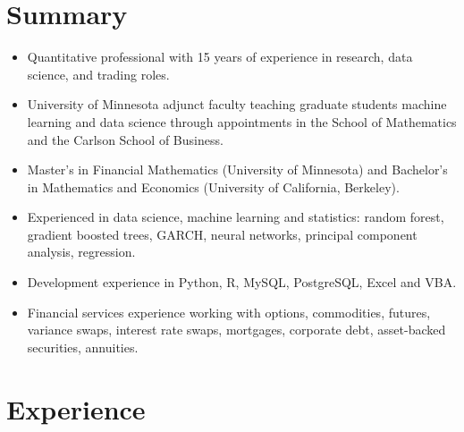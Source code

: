 \documentclass[11pt,a4paper,]{awesome-cv}
\begin{document}
\makecvheader






\hypertarget{summary}{%
\section{Summary}\label{summary}}

\begin{itemize}
\item
  Quantitative professional with 15 years of experience in research,
  data science, and trading roles.
\item
  University of Minnesota adjunct faculty teaching graduate students
  machine learning and data science through appointments in the School
  of Mathematics and the Carlson School of Business.
\item
  Master's in Financial Mathematics (University of Minnesota) and
  Bachelor's in Mathematics and Economics (University of California,
  Berkeley).
\item
  Experienced in data science, machine learning and statistics: random
  forest, gradient boosted trees, GARCH, neural networks, principal
  component analysis, regression.
\item
  Development experience in Python, R, MySQL, PostgreSQL, Excel and VBA.
\item
  Financial services experience working with options, commodities,
  futures, variance swaps, interest rate swaps, mortgages, corporate
  debt, asset-backed securities, annuities.
\end{itemize}

\hypertarget{experience}{%
\section{Experience}\label{experience}}
\end{document}
